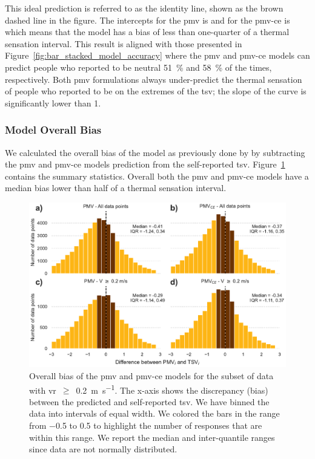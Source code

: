 This ideal prediction is referred to as the identity line, shown as the brown dashed line in the figure.
The intercepts for the \ac{pmv} is  and for the \ac{pmv-ce} is  which means that the model has a bias of less than one-quarter of a thermal sensation interval.
This result is aligned with those presented in Figure~\ref{fig:bar_stacked_model_accuracy} where the \ac{pmv} and \ac{pmv-ce} models can predict people who reported to be neutral \qty{51}{\percent} and \qty{58}{\percent} of the times, respectively.
Both \ac{pmv} formulations always under-predict the thermal sensation of people who reported to be on the extremes of the \ac{tsv};
the slope of the curve is significantly lower than 1.

\subsubsection{Model Overall Bias}\label{subsubsec:model-overall-bias}
We calculated the overall bias of the model as previously done by  by subtracting the \ac{pmv} and \ac{pmv-ce} models prediction from the self-reported \ac{tsv}.
Figure~\ref{fig:hist_discrepancies} contains the summary statistics.
Overall both the \ac{pmv} and \ac{pmv-ce} models have a median bias lower than half of a thermal sensation interval.
\begin{figure}[htb!]
    \centering
    \includegraphics[width=\textwidth]{figures/hist_discrepancies}
    \caption{Overall bias of the \ac{pmv} and \ac{pmv-ce} models for the subset of data with \ac{vr}~$\geq$~\qty{0.2}{\m\per\s}.
    The x-axis shows the discrepancy (bias) between the predicted and self-reported \ac{tsv}.
    We have binned the data into intervals of equal width.
    We colored the bars in the range from \num{-.5} to \num{.5} to highlight the number of responses that are within this range.
    We report the median and inter-quantile ranges since data are not normally distributed.
    }
    \label{fig:hist_discrepancies}
\end{figure}

